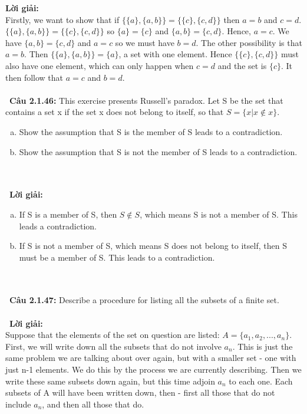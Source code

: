 \documentclass[a4paper]{article}
\begin{document}
\textbf{Lời giải:} \\Firstly, we want to show that if $\{\{a\},\{a,b\}\}=\{\{c\},\{c,d\}\}$ then $a=b$ and $c=d$.$\{\{a\},\{a,b\}\}=\{\{c\},\{c,d\}\}$ so $\{a\}=\{c\}$ and $\{a,b\}=\{c,d\}$. Hence, $a=c$. We have $\{a,b\}=\{c,d\}$ and $a=c$ so we must have $b=d$. The other possibility is that $a=b$. Then $\{\{a\},\{a,b\}\}=\{a\}$, a set with one element. Hence $\{\{c\},\{c,d\}\}$ must also have one element, which can only happen when $c=d$ and the set is $\{c\}$. It then follow that $a=c$ and $b=d$. \\\ \\\
\textbf{Câu 2.1.46: } This exercise presents Russell's paradox. Let S be the set that contains a set x if the set x does not belong to itself, so that $S=\{x|x \notin x\}$.
\begin{enumerate}[a)]
\item  Show the assumption that S is the member of S leads to a contradiction.
\item Show the assumption that S is not the member of S leads to  a contradiction.
\end{enumerate} \\\ \\\
\textbf{Lời giải:} \begin{enumerate}[a)]
\item  If S is a member of S, then $S \notin S$, which means S is not a member of S. This leads a contradiction.
\item If S is not a member of S, which means S does not belong to itself, then S must be a member of S. This leads to a contradiction.
\end{enumerate} \\\ \\\
\textbf{Câu 2.1.47: } Describe a procedure for listing all the subsets of a finite set.  \\\ \\\
\textbf{Lời giải:} \\ Suppose that the elements of the set on question are listed: $A=\{a_{1},a_{2},...,a_{n}\}$. First, we will write down all the subsets that do not involve $a_{n}$. This is just the same problem we are talking about over again, but with a smaller set - one with just n-1 elements. We do this by the process we are currently describing. Then we write these same subsets down again, but this time adjoin $a_{n}$ to each one. Each subsets of A will have been written down, then - first all those that do not include $a_{n}$, and then all those that do.\\
\end{document}
